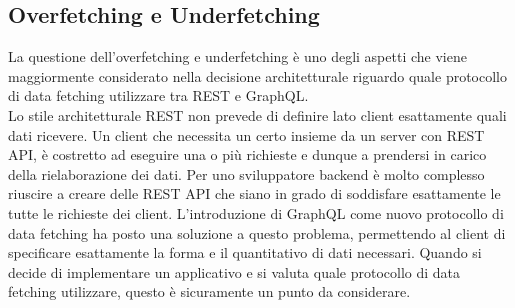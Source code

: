 \subsection{Overfetching e Underfetching}
La questione dell'overfetching e underfetching è uno degli aspetti che viene maggiormente considerato nella decisione architetturale riguardo quale protocollo di data fetching utilizzare tra REST e GraphQL.\\
Lo stile architetturale REST non prevede di definire lato client esattamente quali dati ricevere. Un client che necessita un certo insieme da un server con REST API, è costretto ad eseguire una o più richieste e dunque a prendersi in carico della rielaborazione dei dati. Per uno sviluppatore backend è molto complesso riuscire a creare delle REST API che siano in grado di soddisfare esattamente le tutte le richieste dei client.
L'introduzione di GraphQL come nuovo protocollo di data fetching ha posto una soluzione a questo problema, permettendo al client di specificare esattamente la forma e il quantitativo di dati necessari. Quando si decide di implementare un applicativo e si valuta quale protocollo di data fetching utilizzare, questo è sicuramente un punto da considerare.\\
